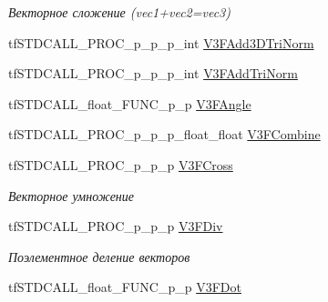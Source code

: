 \begin{DoxyCompactItemize}
\begin{DoxyCompactList}\small\item\em Векторное сложение (vec1+vec2=vec3) \end{DoxyCompactList}\item 
tf\-S\-T\-D\-C\-A\-L\-L\-\_\-\-P\-R\-O\-C\-\_\-p\-\_\-p\-\_\-p\-\_\-int \hyperlink{structs_functions_vector_c_p_u_a15b7fbc4e4923fc2c0d6d7d5d0a9db5b}{V3\-F\-Add3\-D\-Tri\-Norm}
\item 
tf\-S\-T\-D\-C\-A\-L\-L\-\_\-\-P\-R\-O\-C\-\_\-p\-\_\-p\-\_\-p\-\_\-int \hyperlink{structs_functions_vector_c_p_u_a08d9915ec8c447f4fbd7313c776b52ad}{V3\-F\-Add\-Tri\-Norm}
\item 
tf\-S\-T\-D\-C\-A\-L\-L\-\_\-float\-\_\-\-F\-U\-N\-C\-\_\-p\-\_\-p \hyperlink{structs_functions_vector_c_p_u_a763975030f1a632002ced6ddf1fc302c}{V3\-F\-Angle}
\item 
tf\-S\-T\-D\-C\-A\-L\-L\-\_\-\-P\-R\-O\-C\-\_\-p\-\_\-p\-\_\-p\-\_\-float\-\_\-float \hyperlink{structs_functions_vector_c_p_u_ac59b36615b8914b5d81f6cc7632942b5}{V3\-F\-Combine}
\item 
\hypertarget{structs_functions_vector_c_p_u_ad9796a37efe219ab26f6a18037e5acae}{tf\-S\-T\-D\-C\-A\-L\-L\-\_\-\-P\-R\-O\-C\-\_\-p\-\_\-p\-\_\-p \hyperlink{structs_functions_vector_c_p_u_ad9796a37efe219ab26f6a18037e5acae}{V3\-F\-Cross}}\label{structs_functions_vector_c_p_u_ad9796a37efe219ab26f6a18037e5acae}

\begin{DoxyCompactList}\small\item\em Векторное умножение \end{DoxyCompactList}\item 
\hypertarget{structs_functions_vector_c_p_u_a806f76d830f7a288185a2380dc3311bc}{tf\-S\-T\-D\-C\-A\-L\-L\-\_\-\-P\-R\-O\-C\-\_\-p\-\_\-p\-\_\-p \hyperlink{structs_functions_vector_c_p_u_a806f76d830f7a288185a2380dc3311bc}{V3\-F\-Div}}\label{structs_functions_vector_c_p_u_a806f76d830f7a288185a2380dc3311bc}

\begin{DoxyCompactList}\small\item\em Поэлементное деление векторов \end{DoxyCompactList}\item 
\hypertarget{structs_functions_vector_c_p_u_af849460a7e69ae0a69f3a0fb991694bd}{tf\-S\-T\-D\-C\-A\-L\-L\-\_\-float\-\_\-\-F\-U\-N\-C\-\_\-p\-\_\-p \hyperlink{structs_functions_vector_c_p_u_af849460a7e69ae0a69f3a0fb991694bd}{V3\-F\-Dot}}\label{structs_functions_vector_c_p_u_af849460a7e69ae0a69f3a0fb991694bd}


\end{DoxyCompactItemize}
